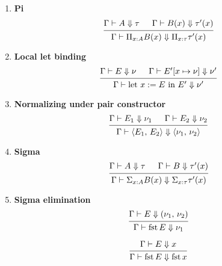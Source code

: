 \documentclass{article}
\begin{document}
\begin{enumerate}
\item \textbf{Pi} \\
  \[
    \begin{prooftree}
      \hypo{\Gamma \vdash A \Downarrow \tau}
      \hypo{\Gamma \vdash B(x) \Downarrow \tau'(x)}
      \infer2{\Gamma \vdash \Pi_{x : A} B(x) \Downarrow \Pi_{x : \tau} \tau'(x)}
    \end{prooftree}
  \]

\item \textbf{Local let binding} \\
    \[
      \begin{prooftree}
        \hypo{\Gamma \vdash E \Downarrow \nu}
        \hypo{\Gamma \vdash E'[x \mapsto \nu] \Downarrow \nu'}
        \infer2{\Gamma \vdash \text{let } x := E \text{ in } E' \Downarrow \nu'}
      \end{prooftree}
    \]

\item \textbf{Normalizing under pair constructor} \\
    \[
      \begin{prooftree}
        \hypo{\Gamma \vdash E_1 \Downarrow \nu_1}
        \hypo{\Gamma \vdash E_2 \Downarrow \nu_2}
        \infer2{\Gamma \vdash \langle E_1, \, E_2 \rangle \Downarrow \langle
          \nu_1, \, \nu_2 \rangle}
      \end{prooftree}
    \]

  \item \textbf{Sigma} \\
    \[
      \begin{prooftree}
        \hypo{\Gamma \vdash A \Downarrow \tau}
        \hypo{\Gamma \vdash B \Downarrow \tau'(x)}
        \infer2{\Gamma \vdash \Sigma_{x : A}B(x) \Downarrow \Sigma_{x : \tau}\tau'(x)}
      \end{prooftree}
    \]

  \item \textbf{Sigma elimination} \\
   \[
    \begin{prooftree}
      \hypo{\Gamma \vdash E \Downarrow (\nu_1, \, \nu_2)}
      \infer1{\Gamma \vdash \fst E \Downarrow \nu_1}
    \end{prooftree}
  \]

  \[
   \begin{prooftree}
    \hypo{\Gamma \vdash E \Downarrow x}
     \infer1{\Gamma \vdash \fst E \Downarrow \fst x}
   \end{prooftree}
  \]


\end{enumerate}
\end{document}
